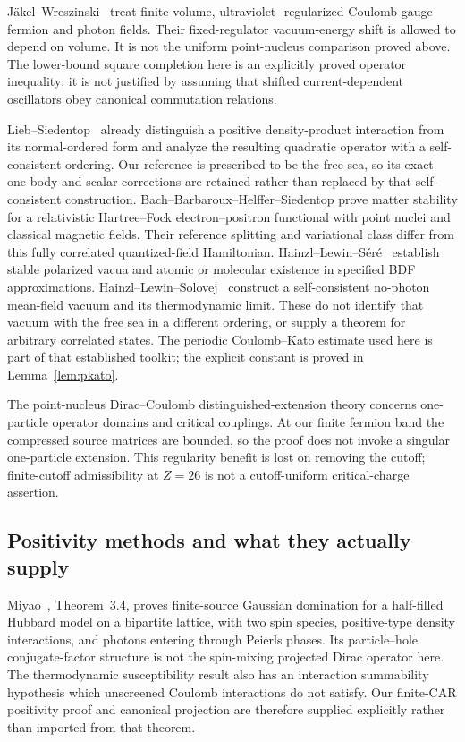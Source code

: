 J\"akel--Wreszinski~\cite{JW2018} treat finite-volume, ultraviolet-
regularized Coulomb-gauge fermion and photon fields. Their fixed-regulator
vacuum-energy shift is allowed to depend on volume. It is not the
uniform point-nucleus comparison proved above. The lower-bound square
completion here is an explicitly proved operator inequality; it is
not justified by assuming that shifted current-dependent oscillators
obey canonical commutation relations.

Lieb--Siedentop~\cite{LS2000} already distinguish a positive
density-product interaction from its normal-ordered form and analyze
the resulting quadratic operator with a self-consistent ordering.
Our reference is prescribed to be the free sea, so its exact one-body
and scalar corrections are retained rather than replaced by that
self-consistent construction. Bach--Barbaroux--Helffer--Siedentop
\cite{BBHS1998} prove matter stability for a relativistic
Hartree--Fock electron--positron functional with point nuclei and
classical magnetic fields. Their reference splitting and variational
class differ from this fully correlated quantized-field Hamiltonian.
Hainzl--Lewin--S\'er\'e~\cite{HLS2004,HLS2005,HLS2008} establish
stable polarized vacua and atomic or molecular existence in specified
BDF approximations. Hainzl--Lewin--Solovej~\cite{HLSol2007} construct
a self-consistent no-photon mean-field vacuum and its thermodynamic
limit. These do not identify that vacuum with the free sea in a
different ordering, or supply a theorem for arbitrary correlated states.
The periodic Coulomb--Kato estimate used here is part of that established
toolkit; the explicit constant is proved in Lemma~\ref{lem:pkato}.

The point-nucleus Dirac--Coulomb distinguished-extension theory
\cite{ELS2021} concerns one-particle operator domains and critical
couplings. At our finite fermion band the compressed source matrices
are bounded, so the proof does not invoke a singular one-particle
extension. This regularity benefit is lost on removing the cutoff;
finite-cutoff admissibility at $Z=26$ is not a cutoff-uniform
critical-charge assertion.

\subsection{Positivity methods and what they actually supply}
Miyao~\cite{Miyao}, Theorem~3.4, proves finite-source Gaussian
domination for a half-filled Hubbard model on a bipartite lattice,
with two spin species, positive-type density interactions, and photons
entering through Peierls phases. Its particle--hole conjugate-factor
structure is not the spin-mixing projected Dirac operator here.
The thermodynamic susceptibility result also has an interaction
summability hypothesis which unscreened Coulomb interactions do not
satisfy. Our finite-CAR positivity proof and canonical projection are
therefore supplied explicitly rather than imported from that theorem.

